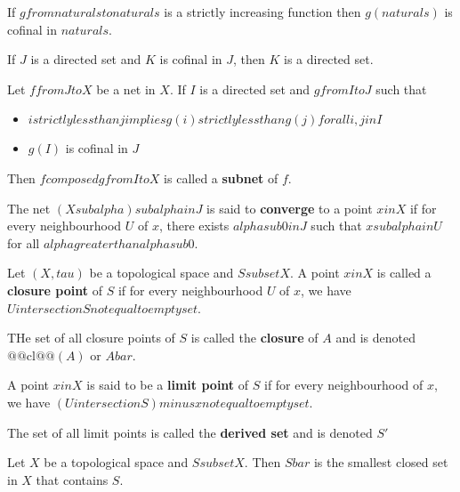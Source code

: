 \begin{prop}
    If $g from naturals to naturals$ is a strictly increasing function then $g(naturals)$ is cofinal in $naturals$.
\end{prop}

\begin{thm}
    If $J$ is a directed set and $K$ is cofinal in $J$, then $K$ is a directed set.
\end{thm}

\begin{defn}
    Let $f from J to X$ be a net in $X$. If $I$ is a directed set and $g from I to J$ such that 
    \begin{itemize}
        \item $i strictly less than j implies g(i) strictly less than g(j) for all i, j in I$
        \item $g(I)$ is cofinal in $J$
    \end{itemize}
    Then $f composed g from I to X$ is called a \textbf{subnet} of $f$.
\end{defn}

\begin{defn}
    The net $(X sub alpha) sub {alpha in J}$ is said to \textbf{converge} to a point $x in X$ if for every neighbourhood $U$ of $x$, there exists $alpha sub 0 in J$ such that $x sub alpha in U$ for all $alpha greater than alpha sub 0$.
\end{defn}

\begin{defn}
    Let $(X, tau)$ be a topological space and $S subset X$. A point $x in X$ is called a \textbf{closure point} of $S$ if for every neighbourhood $U$ of $x$, we have $U intersection S not equal to empty set$.

    THe set of all closure points of $S$ is called the \textbf{closure} of $A$ and is denoted $@@\text{cl}@@(A)$ or $A bar$.
\end{defn}

\begin{defn}
    A point $x in X$ is said to be a \textbf{limit point} of $S$ if for every neighbourhood of $x$, we have $(U intersection S) minus {{ x }} not equal to empty set $.

    The set of all limit points is called the \textbf{derived set} and is denoted $S'$
\end{defn}

\begin{thm}
    Let $X$ be a topological space and $S subset X$. Then $S bar$ is the smallest closed set in $X$ that contains $S$.
\end{thm}


